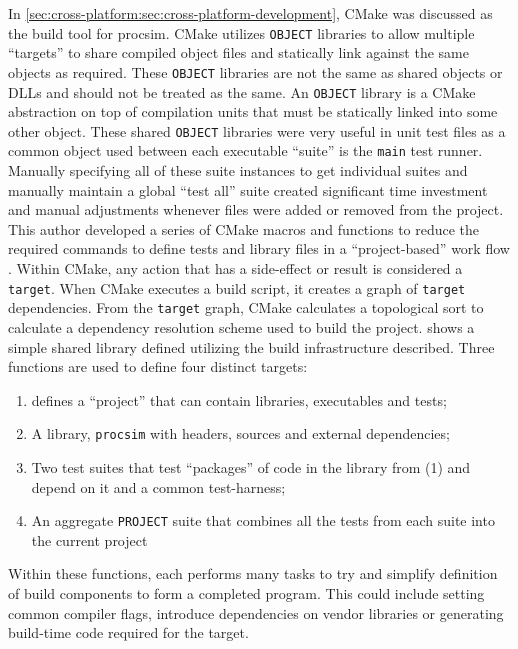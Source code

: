 In \cref{sec:cross-platform:sec:cross-platform-development}, CMake was discussed as the build tool for procsim. CMake utilizes \texttt{OBJECT} libraries to allow multiple ``targets'' to share compiled object files and statically link against the same objects as required. These \texttt{OBJECT} libraries are not the same as shared objects or DLLs and should not be treated as the same. An \texttt{OBJECT} library is a CMake abstraction on top of compilation units that must be statically linked into some other object. These shared \texttt{OBJECT} libraries were very useful in unit test files as a common object used between each executable ``suite'' is the \texttt{main} test runner. Manually specifying all of these suite instances to get individual suites and manually maintain a global ``test all'' suite created significant time investment and manual adjustments whenever files were added or removed from the project. This author developed a series of CMake macros and functions to reduce the required commands to define tests and library files in a ``project-based'' work flow \cite{CMake:macro, CMake:function}. Within CMake, any action that has a side-effect or result is considered a \texttt{target}. When CMake executes a build script, it creates a graph of \texttt{target} dependencies. From the \texttt{target} graph, CMake calculates a topological sort to calculate a dependency resolution scheme used to build the project.  shows a simple shared library defined utilizing the build infrastructure described. Three functions are used to define four distinct targets: 
\begin{enumerate}
    \item {} defines a ``project'' that can contain libraries, executables and tests;
    \item A library, \verb|procsim| with headers, sources and external dependencies;
    \item Two test suites that test ``packages'' of code in the library from (1) and depend on it and a common test-harness;
    \item An aggregate \texttt{PROJECT} suite that combines all the tests from each suite into the current project
\end{enumerate}
Within these functions, each performs many tasks to try and simplify definition of build components to form a completed program. This could include setting common compiler flags, introduce dependencies on vendor libraries or generating build-time code required for the target. 

